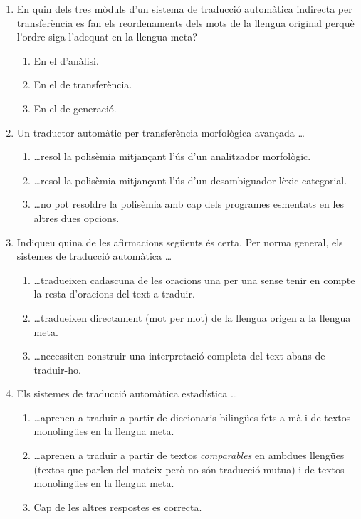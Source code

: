 \begin{enumerate}
\item En quin dels tres mòduls d'un sistema de traducció automàtica
  indirecta per transferència es fan els reordenaments dels mots de la
  llengua original perquè l'ordre siga l'adequat en la llengua meta?
  \begin{enumerate}
  \item En el d'anàlisi.
  \item En el de transferència.
  \item En el de generació.
  \end{enumerate}

\item Un traductor automàtic per transferència morfològica avançada
  \ldots 
  \begin{enumerate}
  \item \ldots resol la polisèmia mitjançant l'ús d'un analitzador
    morfològic.
  \item \ldots resol la polisèmia mitjançant l'ús d'un desambiguador
    lèxic categorial.
  \item \ldots no pot resoldre la polisèmia amb cap dels programes
    esmentats en les altres dues opcions.
  \end{enumerate}

\item Indiqueu quina de les afirmacions següents és certa. Per norma
  general, els sistemes de traducció automàtica \ldots
  \begin{enumerate}
  \item \ldots tradueixen cadascuna de les oracions una per una sense
    tenir en compte la resta d'oracions del text a traduir.
  \item \ldots tradueixen directament (mot per mot) de la llengua
    origen a la llengua meta.
  \item \ldots necessiten construir una interpretació completa del
    text abans de traduir-ho.
 \end{enumerate}

\item Els sistemes de traducció automàtica estadística \ldots
  \begin{enumerate}
  \item \ldots aprenen a traduir a partir de diccionaris bilingües
    fets a mà i de textos monolingües en la llengua meta.
  \item \ldots aprenen a traduir a partir de textos \emph{comparables}
    en ambdues llengües (textos que parlen del mateix però no són
    traducció mutua) i de textos monolingües en la llengua meta.
  \item Cap de les altres respostes es correcta.
  \end{enumerate} 


\end{enumerate}
